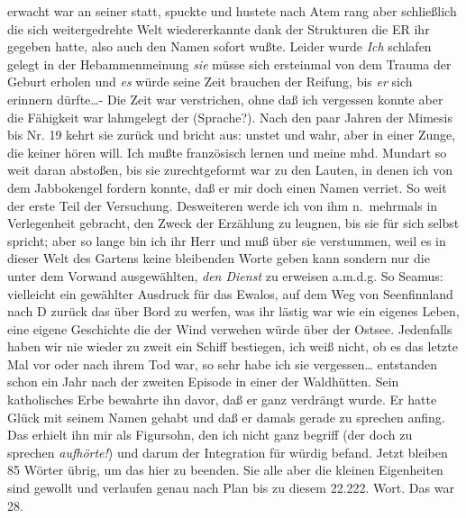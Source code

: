 \documentclass[
]{article}
\begin{document}
erwacht war an seiner statt, spuckte und hustete nach Atem rang aber
schließlich die sich weitergedrehte Welt wiedererkannte dank der
Strukturen die ER ihr gegeben hatte, also auch den Namen sofort wußte.
Leider wurde \emph{Ich} schlafen gelegt in der Hebammenmeinung
\emph{sie} müsse sich ersteinmal von dem Trauma der Geburt erholen und
\emph{es} würde seine Zeit brauchen der Reifung, bis \emph{er} sich
erinnern dürfte\ldots- Die Zeit war verstrichen, ohne daß ich vergessen
konnte aber die Fähigkeit war lahmgelegt der (Sprache?). Nach den paar
Jahren der Mimesis bis Nr. 19 kehrt sie zurück und bricht aus: unstet
und wahr, aber in einer Zunge, die keiner hören will. Ich mußte
französisch lernen und meine mhd. Mundart so weit daran abstoßen, bis
sie zurechtgeformt war zu den Lauten, in denen ich von dem Jabbokengel
fordern konnte, daß er mir doch einen Namen verriet. So weit der erste
Teil der Versuchung. Desweiteren werde ich von ihm n.~mehrmals in
Verlegenheit gebracht, den Zweck der Erzählung zu leugnen, bis sie für
sich selbst spricht; aber so lange bin ich ihr Herr und muß über sie
verstummen, weil es in dieser Welt des Gartens keine bleibenden Worte
geben kann sondern nur die unter dem Vorwand ausgewählten, \emph{den
Dienst} zu erweisen a.m.d.g. So Seamus: vielleicht ein gewählter
Ausdruck für das Ewalos, auf dem Weg von Seenfinnland nach D zurück das
über Bord zu werfen, was ihr lästig war wie ein eigenes Leben, eine
eigene Geschichte die der Wind verwehen würde über der Ostsee.
Jedenfalls haben wir nie wieder zu zweit ein Schiff bestiegen, ich weiß
nicht, ob es das letzte Mal vor oder nach ihrem Tod war, so sehr habe
ich sie vergessen\ldots{} entstanden schon ein Jahr nach der zweiten
Episode in einer der Waldhütten. Sein katholisches Erbe bewahrte ihn
davor, daß er ganz verdrängt wurde. Er hatte Glück mit seinem Namen
gehabt und daß er damals gerade zu sprechen anfing. Das erhielt ihn mir
als Figursohn, den ich nicht ganz begriff (der doch zu sprechen
\emph{aufhörte!}) und darum der Integration für würdig befand. Jetzt
bleiben 85 Wörter übrig, um das hier zu beenden. Sie alle aber die
kleinen Eigenheiten sind gewollt und verlaufen genau nach Plan bis zu
diesem 22.222. Wort. Das war 28.
\end{document}

